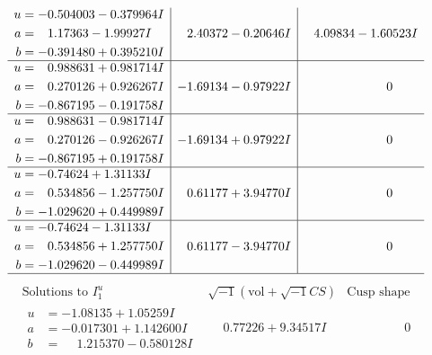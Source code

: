 \documentclass[1p]{elsarticle_modified}
\theoremstyle{definition}
\newcommand{\I}{\sqrt{-1}}
\begin{document}
$$\begin{array}{c|c|c}
\begin{aligned}
u &= -0.504003 - 0.379964 I \\
a &= \phantom{-}1.17363 - 1.99927 I \\
b &= -0.391480 + 0.395210 I\end{aligned}
 & \phantom{-}2.40372 - 0.20646 I & \phantom{-}4.09834 - 1.60523 I \\ \hline\begin{aligned}
u &= \phantom{-}0.988631 + 0.981714 I \\
a &= \phantom{-}0.270126 + 0.926267 I \\
b &= -0.867195 - 0.191758 I\end{aligned}
 & -1.69134 - 0.97922 I & \phantom{-0.000000 } 0 \\ \hline\begin{aligned}
u &= \phantom{-}0.988631 - 0.981714 I \\
a &= \phantom{-}0.270126 - 0.926267 I \\
b &= -0.867195 + 0.191758 I\end{aligned}
 & -1.69134 + 0.97922 I & \phantom{-0.000000 } 0 \\ \hline\begin{aligned}
u &= -0.74624 + 1.31133 I \\
a &= \phantom{-}0.534856 - 1.257750 I \\
b &= -1.029620 + 0.449989 I\end{aligned}
 & \phantom{-}0.61177 + 3.94770 I & \phantom{-0.000000 } 0 \\ \hline\begin{aligned}
u &= -0.74624 - 1.31133 I \\
a &= \phantom{-}0.534856 + 1.257750 I \\
b &= -1.029620 - 0.449989 I\end{aligned}
 & \phantom{-}0.61177 - 3.94770 I & \phantom{-0.000000 } 0\\
 \hline 
 \end{array}$$\newpage$$\begin{array}{c|c|c}  
\text{Solutions to }I^u_{1}& \I (\text{vol} + \sqrt{-1}CS) & \text{Cusp shape}\\
 \hline 
\begin{aligned}
u &= -1.08135 + 1.05259 I \\
a &= -0.017301 + 1.142600 I \\
b &= \phantom{-}1.215370 - 0.580128 I\end{aligned}
 & \phantom{-}0.77226 + 9.34517 I & \phantom{-0.000000 } 0 \\ \hline\begin{aligned}

\end{aligned}
\end{array}$$
\end{document}
